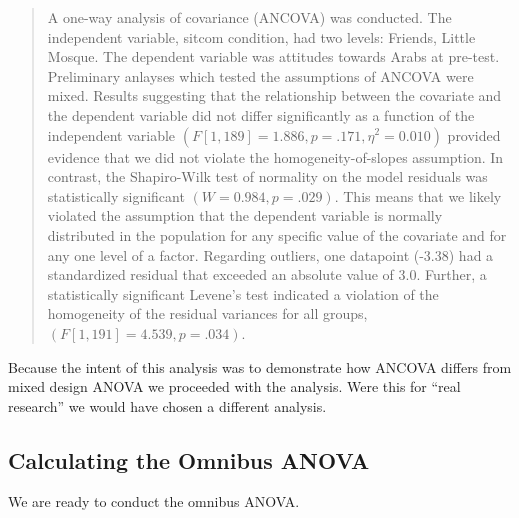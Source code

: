 \documentclass[
  11pt,
]{book}
\begin{document}
\begin{quote}
A one-way analysis of covariance (ANCOVA) was conducted. The independent variable, sitcom condition, had two levels: Friends, Little Mosque. The dependent variable was attitudes towards Arabs at pre-test. Preliminary anlayses which tested the assumptions of ANCOVA were mixed. Results suggesting that the relationship between the covariate and the dependent variable did not differ significantly as a function of the independent variable \((F [1, 189] = 1.886, p = .171, \eta^2 = 0.010)\) provided evidence that we did not violate the homogeneity-of-slopes assumption. In contrast, the Shapiro-Wilk test of normality on the model residuals was statistically significant \((W = 0.984, p = .029)\). This means that we likely violated the assumption that the dependent variable is normally distributed in the population for any specific value of the covariate and for any one level of a factor. Regarding outliers, one datapoint (-3.38) had a standardized residual that exceeded an absolute value of 3.0. Further, a statistically significant Levene's test indicated a violation of the homogeneity of the residual variances for all groups, \((F[1, 191] = 4.539, p = .034)\).
\end{quote}

Because the intent of this analysis was to demonstrate how ANCOVA differs from mixed design ANOVA we proceeded with the analysis. Were this for ``real research'' we would have chosen a different analysis.

\hypertarget{calculating-the-omnibus-anova-1}{%
\subsection{Calculating the Omnibus ANOVA}\label{calculating-the-omnibus-anova-1}}

We are ready to conduct the omnibus ANOVA.
\end{document}
